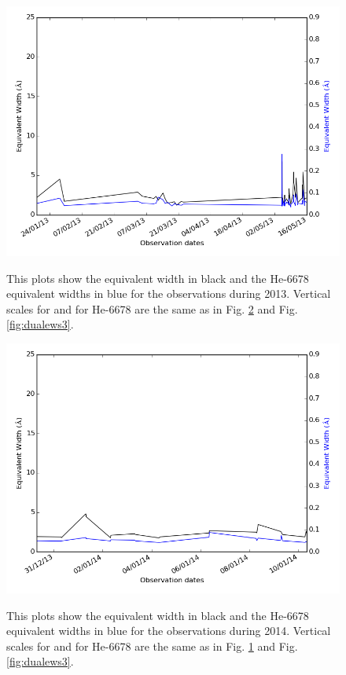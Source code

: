 \begin{figure}[!htbp]
\begin{center}
\includegraphics[scale=0.50]{Figures/dualcomb1.png} \\
\end{center}   
\caption{This plots show the {\ha} equivalent width in black and the He-6678 equivalent widths in blue for the {\harps}
  observations during 2013. Vertical scales for {\ha} and for He-6678 are the same as in Fig. \ref{fig:dualews2} and
  Fig. \ref{fig:dualews3}.}
 \protect\label{fig:dualews1}
\end{figure}

\begin{figure}[!htbp]
\begin{center}
\includegraphics[scale=0.50]{Figures/dualcomb2.png} \\
\end{center}   
\caption{This plots show the {\ha} equivalent width in black and the He-6678 equivalent widths in blue for the {\harps}
  observations during 2014. Vertical scales for {\ha} and for He-6678 are the same as in Fig. \ref{fig:dualews1} and
  Fig. \ref{fig:dualews3}.}
 \protect\label{fig:dualews2}
\end{figure}

